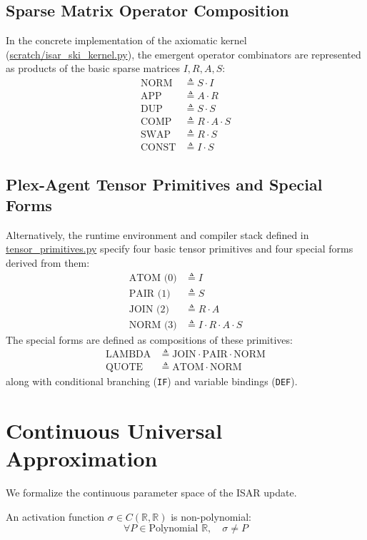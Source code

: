 \subsection{Sparse Matrix Operator Composition}
In the concrete implementation of the axiomatic kernel (\url{scratch/isar_ski_kernel.py}), the emergent operator combinators are represented as products of the basic sparse matrices $I, R, A, S$:
\begin{align*}
\text{NORM} &\triangleq S \cdot I \\
\text{APP} &\triangleq A \cdot R \\
\text{DUP} &\triangleq S \cdot S \\
\text{COMP} &\triangleq R \cdot A \cdot S \\
\text{SWAP} &\triangleq R \cdot S \\
\text{CONST} &\triangleq I \cdot S
\end{align*}

\subsection{Plex-Agent Tensor Primitives and Special Forms}
Alternatively, the runtime environment and compiler stack defined in \url{tensor_primitives.py} specify four basic tensor primitives and four special forms derived from them:
\begin{align*}
\text{ATOM (0)} &\triangleq I \\
\text{PAIR (1)} &\triangleq S \\
\text{JOIN (2)} &\triangleq R \cdot A \\
\text{NORM (3)} &\triangleq I \cdot R \cdot A \cdot S
\end{align*}
The special forms are defined as compositions of these primitives:
\begin{align*}
\text{LAMBDA} &\triangleq \text{JOIN} \cdot \text{PAIR} \cdot \text{NORM} \\
\text{QUOTE} &\triangleq \text{ATOM} \cdot \text{NORM}
\end{align*}
along with conditional branching (\texttt{IF}) and variable bindings (\texttt{DEF}).

\section{Continuous Universal Approximation}

We formalize the continuous parameter space of the ISAR update.

\begin{definition}
An activation function $\sigma \in C(\mathbb{R}, \mathbb{R})$ is non-polynomial:
$$\forall P \in \text{Polynomial } \mathbb{R}, \quad \sigma \neq P$$
\end{definition}

